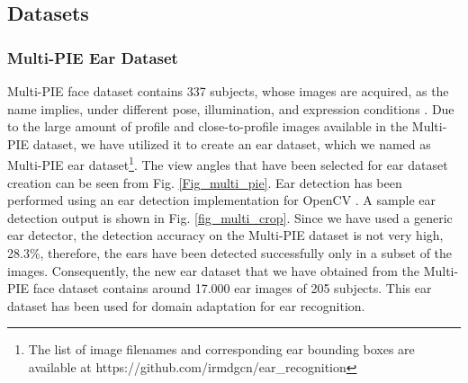 \documentclass[11pt,journal,compsoc]{IEEEtran}
\begin{document}
\subsection{Datasets}\label{subsec2.1}

\subsubsection{Multi-PIE Ear Dataset} 

Multi-PIE face dataset contains 337 subjects, whose images are acquired, as the name implies, under different pose, illumination, and expression conditions \cite{Gross_2008_a,Gross_2008_b}. Due to the large amount of profile and close-to-profile images available in the Multi-PIE dataset, we have utilized it to create an ear dataset, which we named as Multi-PIE ear dataset\footnote{The list of image filenames and corresponding ear bounding boxes are available at https://github.com/irmdgcn/ear\_recognition}. The view angles that have been selected for ear dataset creation can be seen from Fig. \ref{Fig_multi_pie}. 
Ear detection has been performed using an ear detection implementation for OpenCV \cite{Bradski_2000}. 
A sample ear detection output is shown in Fig. \ref{fig_multi_crop}. 
Since we have used a generic ear detector, the detection accuracy on the Multi-PIE dataset is not very high, 28.3\%, therefore, the ears have been detected successfully only in a subset of the images. Consequently, the new ear dataset that we have obtained from the Multi-PIE face dataset \cite{Gross_2008_a,Gross_2008_b} contains around 17.000 ear images of 205 subjects. This ear dataset has been used for domain adaptation for ear recognition.
\end{document}
